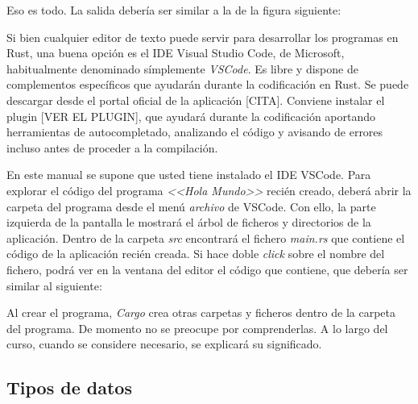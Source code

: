\documentclass[a4paper,11pt]{extarticle}
\begin{document}
Eso es todo. La salida debería ser similar a la de la figura siguiente:


Si bien cualquier editor de texto puede servir para desarrollar los programas en Rust,  una buena opción es el IDE Visual Studio Code, de Microsoft, habitualmente denominado símplemente \textit{VSCode}. Es libre y dispone de complementos específicos que ayudarán durante la codificación en Rust. Se puede descargar desde el portal oficial de la aplicación [CITA]. Conviene instalar el plugin [VER EL PLUGIN], que ayudará durante la codificación aportando herramientas de autocompletado, analizando el código y avisando de errores incluso antes de proceder a la compilación.

En este manual se supone que usted tiene instalado el IDE VSCode. Para explorar el código del programa \textit{<<Hola Mundo>>} recién creado, deberá abrir la carpeta del programa desde el menú \textit{archivo} de VSCode. Con ello, la parte izquierda de la pantalla le mostrará el árbol de ficheros y directorios de la aplicación. Dentro de la carpeta \textit{src} encontrará el fichero \textit{main.rs} que contiene el código de la aplicación recién creada. Si hace doble \textit{click} sobre el nombre del fichero, podrá ver en la ventana del editor el código que contiene, que debería ser similar al siguiente:


Al crear el programa, \textit{Cargo} crea otras carpetas y ficheros dentro de la carpeta del programa. De momento no se preocupe por comprenderlas. A lo largo del curso, cuando se considere necesario, se explicará su significado.

\subsection{Tipos de datos}


\end{document}
